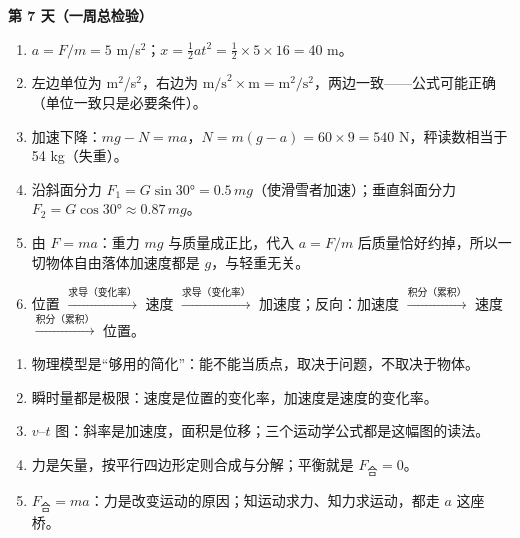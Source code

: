 \documentclass[UTF8,a4paper,11pt]{ctexart}
\begin{document}
\textbf{第 7 天（一周总检验）}
\begin{enumerate}
  \item $a = F/m = 5$ m/s$^2$；$x = \frac{1}{2}at^2 = \frac{1}{2}\times5\times16 = 40$ m。
  \item 左边单位为 m$^2$/s$^2$，右边为 $\text{m/s}^2 \times \text{m} = \text{m}^2/\text{s}^2$，两边一致——公式可能正确（单位一致只是必要条件）。
  \item 加速下降：$mg - N = ma$，$N = m(g-a) = 60\times9 = 540$ N，秤读数相当于 54 kg（失重）。
  \item 沿斜面分力 $F_1 = G\sin30° = 0.5\,mg$（使滑雪者加速）；垂直斜面分力 $F_2 = G\cos30° \approx 0.87\,mg$。
  \item 由 $F=ma$：重力 $mg$ 与质量成正比，代入 $a = F/m$ 后质量恰好约掉，所以一切物体自由落体加速度都是 $g$，与轻重无关。
  \item 位置 $\xrightarrow{\text{求导（变化率）}}$ 速度 $\xrightarrow{\text{求导（变化率）}}$ 加速度；反向：加速度 $\xrightarrow{\text{积分（累积）}}$ 速度 $\xrightarrow{\text{积分（累积）}}$ 位置。
\end{enumerate}

\vspace{1em}
\begin{keyconcept}
\begin{enumerate}
  \item 物理模型是“够用的简化”：能不能当质点，取决于问题，不取决于物体。
  \item 瞬时量都是极限：速度是位置的变化率，加速度是速度的变化率。
  \item $v$–$t$ 图：斜率是加速度，面积是位移；三个运动学公式都是这幅图的读法。
  \item 力是矢量，按平行四边形定则合成与分解；平衡就是 $F_{\text{合}}=0$。
  \item $F_{\text{合}}=ma$：力是改变运动的原因；知运动求力、知力求运动，都走 $a$ 这座桥。
\end{enumerate}
\end{keyconcept}
\end{document}
